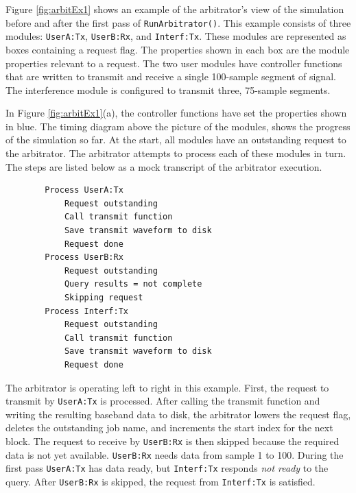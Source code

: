 Figure \ref{fig:arbitEx1} shows an example of the arbitrator's view
of the simulation before and after the first pass of
\verb+RunArbitrator()+.  This example consists of three modules:
\verb+UserA:Tx+, \verb+UserB:Rx+, and \verb+Interf:Tx+.  These
modules are represented as boxes containing a request flag.  The
properties shown in each box are the module properties relevant to a
request.  The two user modules have controller functions that are
written to transmit and receive a single 100-sample segment of
signal.  The interference module is configured to transmit three,
75-sample segments.

In Figure \ref{fig:arbitEx1}(a), the controller functions have set
the properties shown in blue.  The timing diagram above the picture
of the modules, shows the progress of the simulation so far.  At the
start, all modules have an outstanding request to the arbitrator.
The arbitrator attempts to process each of these modules in turn.
The steps are listed below as a mock transcript of the arbitrator
execution.

\begin{verbatim}
        Process UserA:Tx
            Request outstanding
            Call transmit function
            Save transmit waveform to disk
            Request done
        Process UserB:Rx
            Request outstanding
            Query results = not complete
            Skipping request
        Process Interf:Tx
            Request outstanding
            Call transmit function
            Save transmit waveform to disk
            Request done
\end{verbatim}

The arbitrator is operating left to right in this example. First,
the request to transmit by \verb+UserA:Tx+ is processed. After
calling the transmit function and writing the resulting baseband
data to disk, the arbitrator lowers the request flag, deletes the
outstanding job name, and increments the start index for the next
block.  The request to receive by \verb+UserB:Rx+ is then skipped
because the required data is not yet available. \verb+UserB:Rx+
needs data from sample 1 to 100.  During the first pass
\verb+UserA:Tx+ has data ready, but \verb+Interf:Tx+ responds
\emph{not ready} to the query. After \verb+UserB:Rx+ is skipped, the
request from \verb+Interf:Tx+ is satisfied.

